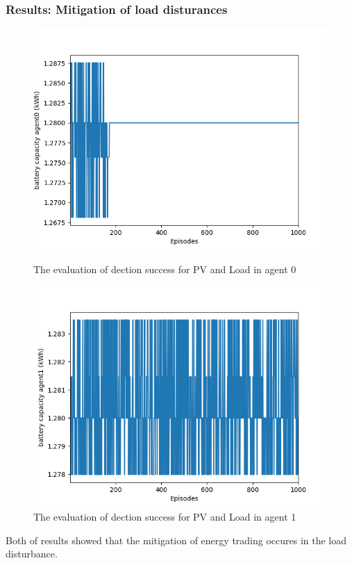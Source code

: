 \documentclass{beamer}
\begin{document}
\begin{frame}
\frametitle{Results: Mitigation of load disturances}
    \begin{figure}
\centering
    \begin{minipage}{.475\textwidth}
    \centering
   \includegraphics[scale=0.25]{presentation/result_3_v1_2.png}
   \caption{The evaluation of dection success for PV and Load in agent 0}
   \end{minipage}
    \begin{minipage}{.475\textwidth}
   \centering
   \includegraphics[scale=0.25]{presentation/result_3_v2.png}
   \caption{The evaluation of dection success for PV and Load in agent 1}
   \end{minipage}
\end{figure}
\bit
\item Both of results showed that the mitigation of energy trading occures in the load disturbance. 
\eit
\end{frame}
\end{document}
